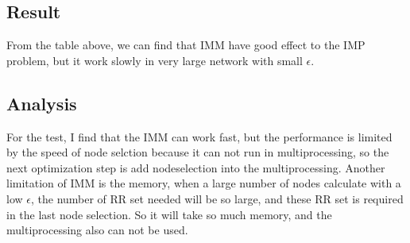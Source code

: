 \documentclass[conference,compsoc]{IEEEtran}
\begin{document}
  \subsection{Result}
    From the table above, we can find that IMM have good effect to the IMP problem, but it work slowly in very large network with small $\epsilon$.
  \subsection{Analysis}
    For the test, I find that the IMM can work fast, but the performance is limited by the speed of node selction because it can not run in multiprocessing, so the next optimization step is add nodeselection into the multiprocessing.
    Another limitation of IMM is the memory, when a large number of nodes calculate with a low $\epsilon$, the number of RR set needed will be so large, and these RR set is required in the last node selection. So it will take so much memory, and the multiprocessing also can not be used.


\end{document}
